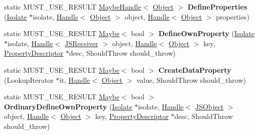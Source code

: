 \begin{DoxyCompactItemize}
\item 
static M\+U\+S\+T\+\_\+\+U\+S\+E\+\_\+\+R\+E\+S\+U\+LT \hyperlink{classv8_1_1internal_1_1_maybe_handle}{Maybe\+Handle}$<$ \hyperlink{classv8_1_1internal_1_1_object}{Object} $>$ {\bfseries Define\+Properties} (\hyperlink{classv8_1_1internal_1_1_isolate}{Isolate} $\ast$isolate, \hyperlink{classv8_1_1internal_1_1_handle}{Handle}$<$ \hyperlink{classv8_1_1internal_1_1_object}{Object} $>$ object, \hyperlink{classv8_1_1internal_1_1_handle}{Handle}$<$ \hyperlink{classv8_1_1internal_1_1_object}{Object} $>$ properties)\hypertarget{classv8_1_1internal_1_1_j_s_receiver_abf565cd9895b74a8b0ec2451f7febdc6}{}\label{classv8_1_1internal_1_1_j_s_receiver_abf565cd9895b74a8b0ec2451f7febdc6}

\item 
static M\+U\+S\+T\+\_\+\+U\+S\+E\+\_\+\+R\+E\+S\+U\+LT \hyperlink{classv8_1_1_maybe}{Maybe}$<$ bool $>$ {\bfseries Define\+Own\+Property} (\hyperlink{classv8_1_1internal_1_1_isolate}{Isolate} $\ast$isolate, \hyperlink{classv8_1_1internal_1_1_handle}{Handle}$<$ \hyperlink{classv8_1_1internal_1_1_j_s_receiver}{J\+S\+Receiver} $>$ object, \hyperlink{classv8_1_1internal_1_1_handle}{Handle}$<$ \hyperlink{classv8_1_1internal_1_1_object}{Object} $>$ key, \hyperlink{classv8_1_1internal_1_1_property_descriptor}{Property\+Descriptor} $\ast$desc, Should\+Throw should\+\_\+throw)\hypertarget{classv8_1_1internal_1_1_j_s_receiver_a3e6987fce7b06d612460797608bb4e56}{}\label{classv8_1_1internal_1_1_j_s_receiver_a3e6987fce7b06d612460797608bb4e56}

\item 
static M\+U\+S\+T\+\_\+\+U\+S\+E\+\_\+\+R\+E\+S\+U\+LT \hyperlink{classv8_1_1_maybe}{Maybe}$<$ bool $>$ {\bfseries Create\+Data\+Property} (Lookup\+Iterator $\ast$it, \hyperlink{classv8_1_1internal_1_1_handle}{Handle}$<$ \hyperlink{classv8_1_1internal_1_1_object}{Object} $>$ value, Should\+Throw should\+\_\+throw)\hypertarget{classv8_1_1internal_1_1_j_s_receiver_a242e030f48fd37fb16ca803124d957d5}{}\label{classv8_1_1internal_1_1_j_s_receiver_a242e030f48fd37fb16ca803124d957d5}

\item 
static M\+U\+S\+T\+\_\+\+U\+S\+E\+\_\+\+R\+E\+S\+U\+LT \hyperlink{classv8_1_1_maybe}{Maybe}$<$ bool $>$ {\bfseries Ordinary\+Define\+Own\+Property} (\hyperlink{classv8_1_1internal_1_1_isolate}{Isolate} $\ast$isolate, \hyperlink{classv8_1_1internal_1_1_handle}{Handle}$<$ \hyperlink{classv8_1_1internal_1_1_j_s_object}{J\+S\+Object} $>$ object, \hyperlink{classv8_1_1internal_1_1_handle}{Handle}$<$ \hyperlink{classv8_1_1internal_1_1_object}{Object} $>$ key, \hyperlink{classv8_1_1internal_1_1_property_descriptor}{Property\+Descriptor} $\ast$desc, Should\+Throw should\+\_\+throw)\hypertarget{classv8_1_1internal_1_1_j_s_receiver_a3040aab112fb9f6493c97fe7d114bbee}{}\label{classv8_1_1internal_1_1_j_s_receiver_a3040aab112fb9f6493c97fe7d114bbee}


\end{DoxyCompactItemize}
